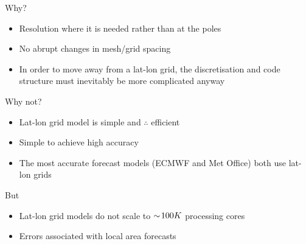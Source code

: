\begin{frame}
\begin{block}{Why?}
\pause
\begin{itemize}
\item Resolution where it is needed rather than at the poles
\item No abrupt changes in mesh/grid spacing
\item In order to move away from a lat-lon grid, the discretisation and code structure must inevitably be more complicated anyway   
\end{itemize}
\pause
\end{block}

\begin{block}{Why not?}
\pause
\begin{itemize}
\item Lat-lon grid model is simple and $\therefore$ efficient
\item Simple to achieve high accuracy
\item The most accurate forecast models (ECMWF and Met Office) both use lat-lon grids
\end{itemize}
\pause

\end{block}
\begin{block}{But}
\pause

\begin{itemize}
\item Lat-lon grid models do not scale to $\sim\negthinspace 100K$ processing cores
\item Errors associated with local area forecasts
\end{itemize}
\end{block}
\end{frame}

